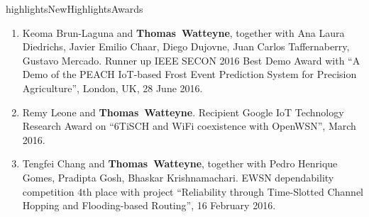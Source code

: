 \documentclass{ra2016}
\newcommand{\thomas}           {\textbf{Thomas~Watteyne}}
\begin{document}

\begin{module}{highlights}{NewHighlights}{Awards}


\begin{enumerate}
    \item Keoma Brun-Laguna and \thomas, together with Ana Laura Diedrichs,  Javier Emilio Chaar, Diego Dujovne, Juan Carlos Taffernaberry, Gustavo Mercado. Runner up IEEE SECON 2016 Best Demo Award with ``A Demo of the PEACH IoT-based Frost Event Prediction System for Precision Agriculture'', London, UK, 28 June 2016.
    \item Remy Leone and \thomas. Recipient Google IoT Technology Research Award on ``6TiSCH and WiFi coexistence with OpenWSN'', March 2016.
    \item Tengfei Chang and \thomas, together with Pedro Henrique Gomes, Pradipta Gosh, Bhaskar Krishnamachari. EWSN dependability competition 4th place with project ``Reliability through Time-Slotted Channel Hopping and Flooding-based Routing'', 16 February 2016.
\end{enumerate}


\end{module}
\end{document}
